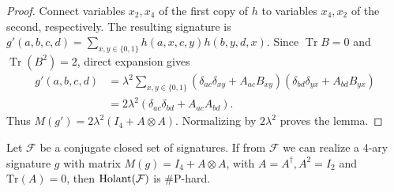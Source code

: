 \begin{proof}
Connect variables $x_2,x_4$ of the first copy of $h$ to variables
$x_4,x_2$ of the second, respectively.
The resulting signature is
$g'(a,b,c,d)=\sum_{x,y\in\{0,1\}}h(a,x,c,y)h(b,y,d,x)$.
Since $\operatorname{Tr}B=0$ and
$\operatorname{Tr}(B^2)=2$, direct expansion gives
\[
\begin{aligned}
g'(a,b,c,d)
&=\lambda^2\sum_{x,y\in\{0,1\}}
  (\delta_{ac}\delta_{xy}+A_{ac}B_{xy})
  (\delta_{bd}\delta_{yx}+A_{bd}B_{yx})\\
&=2\lambda^2
  (\delta_{ac}\delta_{bd}+A_{ac}A_{bd}).
\end{aligned}
\]
Thus $M(g')=2\lambda^2(I_4+A\otimes A)$.
Normalizing by $2\lambda^2$ proves the lemma.
\end{proof}

\begin{lemma}\label{lm: I+AA implies hard}
    Let $\mathcal{F}$ be a conjugate closed set of signatures.
    If from $\mathcal{F}$ we can realize a 4-ary signature $g$ with matrix $M(g)=I_4+A\otimes A$, with $A=A^{\dagger}, A^2=I_2$ and $\mathrm{Tr}(A)=0$, then $\operatorname{Holant}(\mathcal{F})$ is \#P-hard.
\end{lemma}
